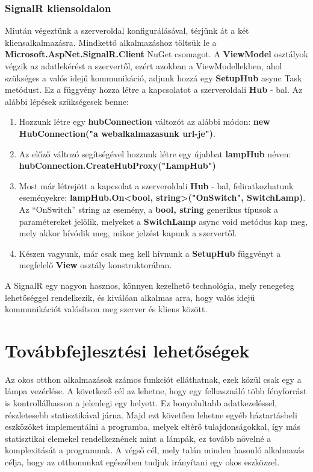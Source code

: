 \documentclass[a4paper,12pt]{report}
\begin{document}
    \subsubsection{SignalR kliensoldalon}
    Miután végeztünk a szerveroldal konfigurálásával, térjünk át a két kliensalkalmazásra. Mindkettő alkalmazáshoz töltsük le a
    \textbf{Microsoft.AspNet.SignalR.Client} NuGet csomagot. A \textbf{ViewModel} osztályok végzik az adatlekérést a szervertől,
    ezért azokban a ViewModellekben, ahol szükséges a valós idejű kommunikáció, adjunk hozzá egy \textbf{SetupHub} async Task metódust.
    Ez a függvény hozza létre a kapcsolatot a szerveroldali \textbf{Hub} - bal. Az alábbi lépések szükségesek benne:

    \begin{enumerate}
        \item Hozzunk létre egy \textbf{hubConnection} változót az alábbi módon: \textbf{new HubConnection("a webalkalmazasunk url-je")}.
        \item Az előző változó segítségével hozzunk létre egy újabbat \textbf{lampHub} néven: \textbf{hubConnection.CreateHubProxy("LampHub")}
        \item Most már létrejött a kapcsolat a szerveroldali \textbf{Hub} - bal, feliratkozhatunk eseményekre: \textbf{lampHub.On<bool, string>("OnSwitch", SwitchLamp)}.
        Az ``OnSwitch'' string az esemény, a \textbf{bool, string} generikus típusok a paramétereket jelölik, melyeket a \textbf{SwitchLamp}
        async void metódus kap meg, mely akkor hívódik meg, mikor jelzést kapunk a szervertől.
        \item Készen vagyunk, már csak meg kell hívnunk a \textbf{SetupHub} függvényt a megfelelő \textbf{View} osztály konstruktorában.
    \end{enumerate}

    A SignalR egy nagyon hasznos, könnyen kezelhető technológia, mely renegeteg lehetőséggel rendelkezik, és kiválóan alkalmas
    arra, hogy valós idejű kommunikációt valósítson meg szerver és kliens között.

    \section{Továbbfejlesztési lehetőségek}
    Az okos otthon alkalmazások számos funkciót elláthatnak, ezek közül csak egy a lámpa vezérlése. A következő cél az lehetne,
    hogy egy felhasználó több fényforrást is kontrollálhasson a jelenlegi egy helyett. Ez bonyolultabb adatkezeléssel, részletesebb statisztikával
    járna. Majd ezt követően lehetne egyéb háztartásbeli eszközöket implementálni a programba, melyek eltérő tulajdonságokkal, így
    más statisztikai elemekel rendelkeznének mint a lámpák, ez tovább növelné a komplexitását a programnak. A végső cél, mely
    talán minden hasonló alkalmazás célja, hogy az otthonunkat egészében tudjuk irányítani egy okos eszközzel.\\
\end{document}
